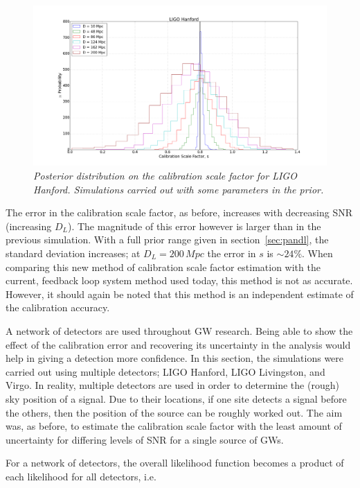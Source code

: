 \documentclass[12pt]{iopart}
\begin{document}
\begin{figure}
  \centering
  \includegraphics[width = \textwidth]{SD_non_empty_D10_200}
  \caption{\textit{Posterior distribution on the calibration scale factor for
LIGO Hanford. Simulations carried out with some parameters in the prior.}}
  \label{fig:sd-non-empty-D}
\end{figure}

The error in the calibration scale factor, as before, increases with decreasing
SNR (increasing $D_{L}$). The magnitude of this error however is larger than in
the previous simulation. With a full prior range given in
section~\ref{sec:pandl}, the standard deviation increases; at $D_{L} =
200\,Mpc$ the error in $s$ is $\sim 24\%$. When comparing this new method of
calibration scale factor estimation with the current, feedback loop system
method used today, this method is not as accurate. However, it should again be
noted that this method is an independent estimate of the calibration accuracy.

A network of detectors are used throughout GW research. Being able to show the
effect of the calibration error and recovering its uncertainty in the analysis
would help in giving a detection more confidence. In this section, the
simulations were carried out using multiple detectors; LIGO Hanford, LIGO
Livingston, and Virgo. In reality, multiple detectors are used in order to
determine the (rough) sky position of a signal. Due to their locations, if one
site detects a signal before the others, then the position of the source can be
roughly worked out. The aim was, as before, to estimate the calibration scale
factor with the least amount of uncertainty for differing levels of SNR for a
single source of GWs.

For a network of detectors, the overall likelihood function becomes a product
of each likelihood for all detectors, i.e.
\end{document}
